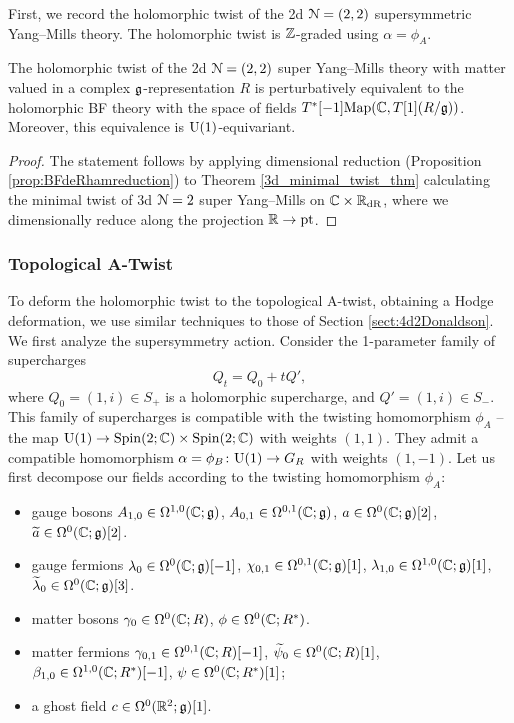 \documentclass[10pt, oneside]{article}
\begin{document}
First, we record the holomorphic twist of the 2d $\mathcal N=(2,2)$ supersymmetric Yang--Mills theory. The holomorphic twist is $\mathbb Z$-graded using $\alpha = \phi_A$.

\begin{theorem} \label{2d_minimal_twist_thm}
The holomorphic twist of the 2d $\mathcal N=(2,2)$ super Yang--Mills theory with matter valued in a complex $\mathfrak g$-representation $R$ is perturbatively equivalent to the holomorphic BF theory with the space of fields $T^*[-1]\mathrm{Map}(\mathbb C, T[1](R/\mathfrak{g}))$. Moreover, this equivalence is $\mathrm{U}(1)$-equivariant.
\end{theorem}
\begin{proof}
The statement follows by applying dimensional reduction (Proposition \ref{prop:BFdeRhamreduction}) to Theorem \ref{3d_minimal_twist_thm} calculating the minimal twist of 3d $\mathcal N=2$ super Yang--Mills on $\mathbb C\times \mathbb R_{\mathrm{dR}}$, where we dimensionally reduce along the projection $\mathbb R\rightarrow \operatorname{pt}$.
\end{proof}

\subsubsection{Topological A-Twist} \label{sect:2d22Atwist}

To deform the holomorphic twist to the topological A-twist, obtaining a Hodge deformation, we use similar techniques to those of Section \ref{sect:4d2Donaldson}.  We first analyze the supersymmetry action.  Consider the 1-parameter family of supercharges
\begin{equation} \label{eq:2dHodgefamily}
Q_t = Q_0 + tQ',
\end{equation}
where $Q_0 = (1,i) \in S_+$ is a holomorphic supercharge, and $Q' = (1,i) \in S_-$.  This family of supercharges is compatible with the twisting homomorphism $\phi_A$ -- the map $\mathrm{U}(1) \to \mathrm{Spin}(2;\mathbb C) \times \mathrm{Spin}(2;\mathbb C)$ with weights $(1,1)$. They admit a compatible homomorphism $\alpha=\phi_B\colon \mathrm{U}(1)\rightarrow G_R$ with weights $(1,-1)$.  Let us first decompose our fields according to the twisting homomorphism $\phi_A$:

\begin{itemize}
\item gauge bosons $A_{1,0} \in \Omega^{1,0}(\mathbb C; \mathfrak g)$, $A_{0,1} \in \Omega^{0,1} (\mathbb C ; \mathfrak g)$, $a \in \Omega^0(\mathbb C ; \mathfrak g)[2]$, $\widetilde{a} \in \Omega^0(\mathbb C ; \mathfrak g)[2]$. 
\item gauge fermions $\lambda_0 \in \Omega^{0}(\mathbb C ; \mathfrak g)[-1]$, $\chi_{0,1} \in \Omega^{0,1}(\mathbb C ; \mathfrak g) [1]$, $\lambda_{1,0} \in \Omega^{1,0}(\mathbb C ; \mathfrak g)[1]$, $\widetilde{\lambda}_0 \in \Omega^0(\mathbb C ; \mathfrak g) [3]$.
 \item matter bosons $\gamma_0 \in \Omega^0(\mathbb C ; R)$, $\phi \in \Omega^0(\mathbb C ; R^*)$.
 \item matter fermions $\gamma_{0,1} \in \Omega^{0,1}(\mathbb C ; R)[-1]$, $\widetilde{\psi}_0 \in \Omega^0(\mathbb C ; R)[1]$, $\beta_{1,0} \in \Omega^{1,0}(\mathbb C ; R^*)[-1]$, $\psi \in \Omega^0(\mathbb C ; R^*)[1]$; 
 \item a ghost field $c \in \Omega^0(\mathbb R^2; \mathfrak g)[1]$.
\end{itemize}
\end{document}
